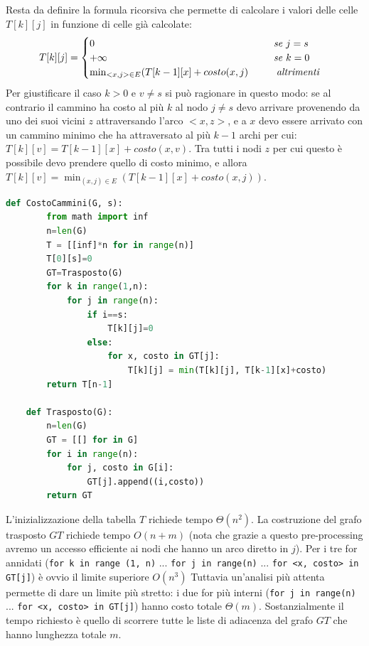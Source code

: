 Resta da definire la formula ricorsiva che permette di calcolare i valori delle celle $T[k][j]$ in funzione di celle già calcolate:
\begin{equation*}T[k][j]=
\begin{cases}
    0\hspace{6.35cm}\textit{se }j=s\\
    +\infty\hspace{5.9cm}\textit{se }k=0\\
    \min_{<x, j>\in E}(T[k-1][x]+costo(x, j)\hspace{1cm}\textit{altrimenti}
\end{cases}
\end{equation*}
Per giustificare il caso $k>0$ e $v\neq s$ si può ragionare in questo modo: se al contrario il cammino ha costo al più $k$ al nodo $j\neq s$ devo arrivare provenendo da uno dei suoi vicini $z$ attraversando l'arco $<x, z>$, e a $x$ devo essere arrivato con un cammino minimo che ha attraversato al più $k-1$ archi per cui: $T[k][v]=T[k-1][x] + costo(x, v)$. Tra tutti i nodi $z$ per cui questo è possibile devo prendere quello di costo minimo, e allora $T[k][v] = \min_{(x, j)\in E}(T[k-1][x] + costo(x,j))$.

\begin{lstlisting}[language=Python]
    def CostoCammini(G, s):
        from math import inf
        n=len(G)
        T = [[inf]*n for in range(n)]
        T[0][s]=0
        GT=Trasposto(G)
        for k in range(1,n):
            for j in range(n):
                if i==s:
                    T[k][j]=0
                else:
                    for x, costo in GT[j]:
                        T[k][j] = min(T[k][j], T[k-1][x]+costo)
        return T[n-1]

    def Trasposto(G):
        n=len(G)
        GT = [[] for in G]
        for i in range(n):
            for j, costo in G[i]:
                GT[j].append((i,costo))
        return GT
\end{lstlisting}
L'inizializzazione della tabella $T$ richiede tempo $\Theta(n ^ 2)$. La costruzione del grafo trasposto $GT$ richiede tempo $O(n + m)$ (nota che grazie a questo pre-processing avremo un accesso efficiente ai nodi che hanno un arco diretto in $j$). Per i tre for annidati (\verb|for k in range (1, n)| ... \verb|for j in range(n)| ... \verb|for <x, costo> in GT[j]|) è ovvio il limite superiore $O(n ^ 3)$ Tuttavia un'analisi più attenta permette di dare un limite più stretto: i due for più interni (\verb|for j in range(n)| ... \verb|for <x, costo> in GT[j]|) hanno costo totale $\Theta(m)$. Sostanzialmente il tempo richiesto è quello di scorrere tutte le liste di adiacenza del grafo $GT$ che hanno lunghezza totale $m$.

